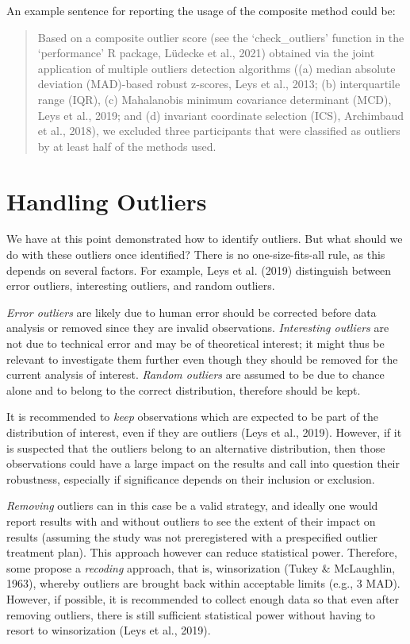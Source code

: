 \documentclass[
]{article}
\begin{document}
An example sentence for reporting the usage of the composite method
could be:

\begin{quote}
Based on a composite outlier score (see the `check\_outliers' function
in the `performance' R package, Lüdecke et al., 2021) obtained via the
joint application of multiple outliers detection algorithms ((a) median
absolute deviation (MAD)-based robust z-scores, Leys et al., 2013; (b)
interquartile range (IQR), (c) Mahalanobis minimum covariance
determinant (MCD), Leys et al., 2019; and (d) invariant coordinate
selection (ICS), Archimbaud et al., 2018), we excluded three
participants that were classified as outliers by at least half of the
methods used.
\end{quote}

\hypertarget{handling-outliers}{%
\section{Handling Outliers}\label{handling-outliers}}

We have at this point demonstrated how to identify outliers. But what
should we do with these outliers once identified? There is no
one-size-fits-all rule, as this depends on several factors. For example,
Leys et al. (2019) distinguish between error outliers, interesting
outliers, and random outliers.

\emph{Error outliers} are likely due to human error should be corrected
before data analysis or removed since they are invalid observations.
\emph{Interesting outliers} are not due to technical error and may be of
theoretical interest; it might thus be relevant to investigate them
further even though they should be removed for the current analysis of
interest. \emph{Random outliers} are assumed to be due to chance alone
and to belong to the correct distribution, therefore should be kept.

It is recommended to \emph{keep} observations which are expected to be
part of the distribution of interest, even if they are outliers (Leys et
al., 2019). However, if it is suspected that the outliers belong to an
alternative distribution, then those observations could have a large
impact on the results and call into question their robustness,
especially if significance depends on their inclusion or exclusion.

\emph{Removing} outliers can in this case be a valid strategy, and
ideally one would report results with and without outliers to see the
extent of their impact on results (assuming the study was not
preregistered with a prespecified outlier treatment plan). This approach
however can reduce statistical power. Therefore, some propose a
\emph{recoding} approach, that is, winsorization (Tukey \& McLaughlin,
1963), whereby outliers are brought back within acceptable limits (e.g.,
3 MAD). However, if possible, it is recommended to collect enough data
so that even after removing outliers, there is still sufficient
statistical power without having to resort to winsorization (Leys et
al., 2019).
\end{document}
